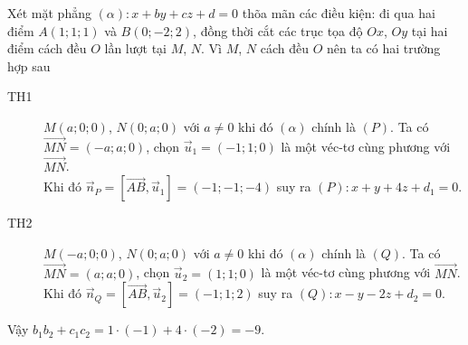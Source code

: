 \begin{ex}
{Xét mặt phẳng $\left(\alpha\right) \colon x+by+cz+d=0$ thõa mãn các điều kiện: đi qua hai điểm $A \left(1;1;1\right)$ và $B\left(0;-2;2\right)$, đồng thời cắt các trục tọa độ $Ox$, $Oy$ tại hai điểm cách đều $O$ lần lượt tại $M$, $N$. Vì $M$, $N$ cách đều $O$ nên ta có hai trường hợp sau
\begin{description}
\item[TH1] $M \left(a;0;0\right)$, $N \left(0;a;0\right)$ với $a \neq 0$ khi đó $\left(\alpha\right)$ chính là $\left(P\right)$. Ta có $\overrightarrow{MN} = \left(-a;a;0\right)$, chọn $\overrightarrow{u}_1 = \left(-1;1;0\right)$ là một véc-tơ cùng phương với $\overrightarrow{MN}$.\\
Khi đó $\overrightarrow{n}_P = \left[\overrightarrow{AB},\overrightarrow{u}_1\right] = \left(-1;-1;-4\right)$
suy ra $\left(P\right) \colon x+y+4z+d_1 = 0$.
\item[TH2] $M \left(-a;0;0\right)$, $N \left(0;a;0\right)$ với $a \neq 0$ khi đó $\left(\alpha\right)$ chính là $\left(Q\right)$. Ta có $\overrightarrow{MN} = \left(a;a;0\right)$, chọn $\overrightarrow{u}_2 = \left(1;1;0\right)$ là một véc-tơ cùng phương với $\overrightarrow{MN}$.\\
Khi đó $\overrightarrow{n}_Q = \left[\overrightarrow{AB},\overrightarrow{u}_2\right] = \left(-1;1;2\right)$
suy ra $\left(Q\right) \colon x-y-2z+d_2 = 0$.
\end{description}
Vậy $b_1b_2 + c_1c_2 = 1 \cdot \left(-1\right) + 4 \cdot \left(-2\right) = -9$.
}
\end{ex}
